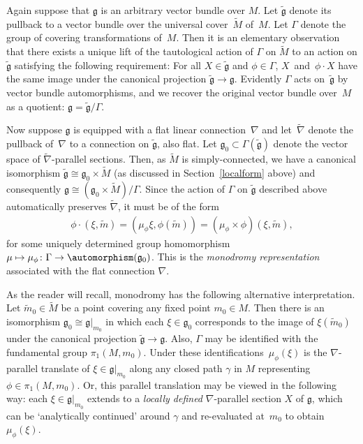 Again suppose that $\mathfrak g$ is an arbitrary vector bundle over
$M$. Let $\tilde {\mathfrak g} $ denote its pullback to a vector
bundle over the universal cover~$\tilde M$ of~$M$. Let $\Gamma$ denote
the group of covering transformations of~$M$. Then it is an elementary
observation that there exists a unique lift of the tautological action
of $\Gamma$ on $\tilde M$ to an action on $\tilde {\mathfrak g} $
satisfying the following requirement: For all $X\in \tilde {\mathfrak
  g} $ and $\phi \in \Gamma$, $X$~and~$\phi \cdot X $ have the same
image under the canonical projection $\tilde {\mathfrak g} \rightarrow
{\mathfrak g}$. Evidently $\Gamma$ acts on~$\tilde {\mathfrak g} $ by
vector bundle automorphisms, and we recover the original vector bundle
over~$M$ as a quotient: ${\mathfrak g}=\tilde {\mathfrak g}/\Gamma $.

Now suppose $\mathfrak g$ is equipped with a f\/lat linear connection~$\nabla$ and let~$\tilde \nabla $ denote the pullback of~$\nabla $ to
a connection on $\tilde {\mathfrak g} $, also f\/lat. Let ${\mathfrak
  g}_0 \subset \Gamma(\tilde {\mathfrak g})$ denote the vector space
of $\tilde \nabla $-parallel sections. Then, as $\tilde M$ is
simply-connected, we have a canonical isomorphism $\tilde {\mathfrak
  g} \cong {\mathfrak g}_0 \times \tilde M$ (as discussed in
Section~\ref{localform} above) and consequently ${\mathfrak g} \cong
({\mathfrak g}_0 \times \tilde M)/\Gamma$.  Since the action of
$\Gamma $ on $\tilde {\mathfrak g} $ described above automatically
preserves $\tilde \nabla $, it must be of the form
\begin{gather}
  \phi \cdot (\xi, \tilde m)=(\mu_\phi \xi,\phi(\tilde m))=(\mu_\phi \times \phi)(\xi,\tilde m),\label{form}
\end{gather}
for some uniquely determined group homomorphism $\mu \mapsto \mu_\phi
\colon \Gamma \rightarrow \automorphism({\mathfrak g}_0)$. This is the
{\it mo\-nodromy representation} associated with the f\/lat connection $\nabla$.

\begin{RemarkBlaom}\label{Remark2.6}
  As the reader will recall, monodromy has the following alternative
  interpretation. Let $\tilde m_0 \in \tilde M$ be a point covering
  any f\/ixed point $m_0 \in M$. Then there is an isomorphism
  ${\mathfrak g}_0 \cong {\mathfrak g}|_{m_0}$ in which each $\xi \in
  {\mathfrak g}_0 $ corresponds to the image of $\xi(\tilde m_0)$
  under the canonical projection $\tilde {\mathfrak g} \rightarrow
  {\mathfrak g}$. Also, $\Gamma$ may be identif\/ied with the
  fundamental group $\pi_1(M,m_0)$. Under these identif\/ications~$\mu_\phi (\xi )$ is the $\nabla$-parallel translate of $\xi \in
  {\mathfrak g}|_{m_0}$ along any closed path $\gamma $ in $M$
  representing $\phi \in \pi_1(M, m_0)$. Or, this parallel translation
  may be viewed in the following way: each $\xi \in {\mathfrak
    g}|_{m_0}$ extends to a {\em locally defined} $\nabla$-parallel
  section $X$ of $\mathfrak g$, which can be `analytically
  continued' around $\gamma $ and re-evaluated at~$m_0$ to obtain
  $\mu_\phi (\xi)$.
\end{RemarkBlaom}

